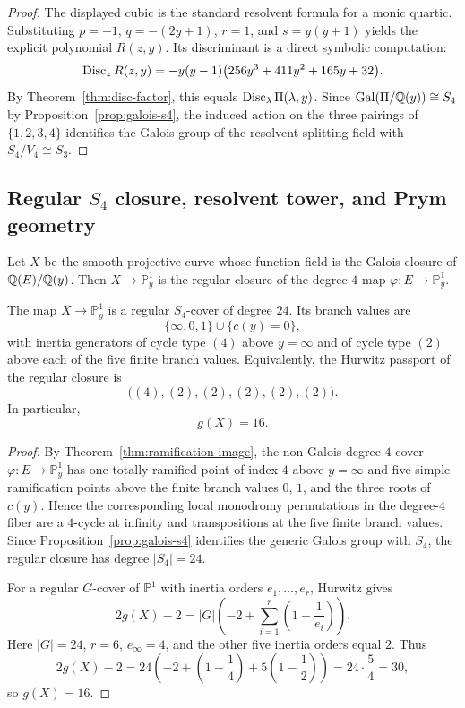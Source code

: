 \begin{proof}
The displayed cubic is the standard resolvent formula for a monic quartic.
Substituting \(p=-1\), \(q=-(2y+1)\), \(r=1\), and \(s=y(y+1)\) yields the explicit polynomial \(R(z,y)\).
Its discriminant is a direct symbolic computation:
\[
\operatorname{Disc}_z R(z,y)=-y(y-1)\bigl(256y^3+411y^2+165y+32\bigr).
\]
By Theorem~\ref{thm:disc-factor}, this equals \(\operatorname{Disc}_\lambda\Pi(\lambda,y)\).
Since \(\mathrm{Gal}(\Pi/\mathbb{Q}(y))\cong S_4\) by Proposition~\ref{prop:galois-s4}, the induced action on the three pairings of \(\{1,2,3,4\}\) identifies the Galois group of the resolvent splitting field with \(S_4/V_4\cong S_3\).
\end{proof}

\subsection{\texorpdfstring{Regular \(S_4\) closure, resolvent tower, and Prym geometry}{Regular S4 closure, resolvent tower, and Prym geometry}}

Let \(X\) be the smooth projective curve whose function field is the Galois closure of \(\mathbb{Q}(E)/\mathbb{Q}(y)\).
Then \(X\to\mathbb{P}^1_y\) is the regular closure of the degree-\(4\) map \(\varphi:E\to\mathbb{P}^1_y\).

\begin{theorem}\label{thm:regular-closure}
The map \(X\to\mathbb{P}^1_y\) is a regular \(S_4\)-cover of degree \(24\).
Its branch values are
\[
\{\infty,0,1\}\cup\{c(y)=0\},
\]
with inertia generators of cycle type \((4)\) above \(y=\infty\) and of cycle type \((2)\) above each of the five finite branch values.
Equivalently, the Hurwitz passport of the regular closure is
\[
\bigl((4),(2),(2),(2),(2),(2)\bigr).
\]
In particular,
\[
g(X)=16.
\]
\end{theorem}

\begin{proof}
By Theorem~\ref{thm:ramification-image}, the non-Galois degree-\(4\) cover \(\varphi:E\to\mathbb{P}^1_y\) has one totally ramified point of index \(4\) above \(y=\infty\) and five simple ramification points above the finite branch values \(0\), \(1\), and the three roots of \(c(y)\).
Hence the corresponding local monodromy permutations in the degree-\(4\) fiber are a \(4\)-cycle at infinity and transpositions at the five finite branch values.
Since Proposition~\ref{prop:galois-s4} identifies the generic Galois group with \(S_4\), the regular closure has degree \(|S_4|=24\).

For a regular \(G\)-cover of \(\mathbb{P}^1\) with inertia orders \(e_1,\dots,e_r\), Hurwitz gives
\[
2g(X)-2=|G|\left(-2+\sum_{i=1}^r\left(1-\frac{1}{e_i}\right)\right).
\]
Here \(|G|=24\), \(r=6\), \(e_\infty=4\), and the other five inertia orders equal \(2\).
Thus
\[
2g(X)-2
=24\left(-2+\left(1-\frac14\right)+5\left(1-\frac12\right)\right)
=24\cdot\frac54
=30,
\]
so \(g(X)=16\).
\end{proof}

